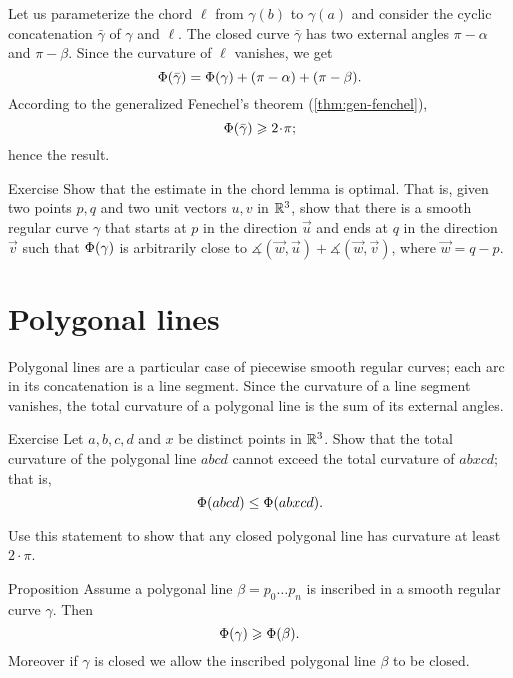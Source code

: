 Let us parameterize the chord $\ell$ from $\gamma(b)$ to $\gamma(a)$ and consider the cyclic concatenation $\bar\gamma$ of $\gamma$ and $\ell$.
The closed curve $\bar\gamma$ has two external angles $\pi-\alpha$ and $\pi-\beta$.
Since the curvature of $\ell$ vanishes, we get 
\[\Phi({\bar\gamma})=\Phi({\gamma})+(\pi-\alpha)+(\pi-\beta).\]
According to the generalized Fenechel's theorem (\ref{thm:gen-fenchel}),
\[\tc{\bar\gamma}\ge 2\cdot\pi;\]
hence the result.
\qeds

\begin{thm}{Exercise}\label{ex:chord-lemma-optimal}
Show that the estimate in the chord lemma is optimal.
That is, given two points $p, q$ and two unit vectors $u,v$ in $\mathbb{R}^3$,
show that there is a smooth regular curve $\gamma$ that starts at $p$ in the direction $\vec u$ and ends at $q$ in the direction $\vec v$ such that 
$\Phi({\gamma})$ is arbitrarily close to $\measuredangle(\vec w,\vec u)+\measuredangle(\vec w,\vec v)$, where $\vec w=q-p$.

\end{thm}

\section*{Polygonal lines} 

Polygonal lines are a particular case of piecewise smooth regular curves;
each arc in its concatenation is a line segment.
Since the curvature of a line segment vanishes, the total curvature of a polygonal line is the sum of its external angles.

\begin{thm}{Exercise}\label{ex:monotonic-tc}
Let $a,b,c,d$ and $x$ be distinct points in $\mathbb{R}^3$.
Show that the total curvature of the polygonal line $abcd$ cannot exceed the total curvature of $abxcd$; that is, 
\[\Phi({abcd}) \leq \Phi({abxcd}).\]

Use this statement to show that any closed polygonal line has curvature at least $2\cdot\pi$.
\end{thm}



\begin{thm}{Proposition}\label{prop:inscribed-total-curvature}
Assume a polygonal line $\beta=p_0\dots p_n$ is inscribed in a smooth regular curve $\gamma$.
Then 
\[\Phi({\gamma})\geqslant \Phi({\beta}).\]
Moreover if $\gamma$ is closed we allow the inscribed polygonal line $\beta$ to be closed.

\end{thm}

